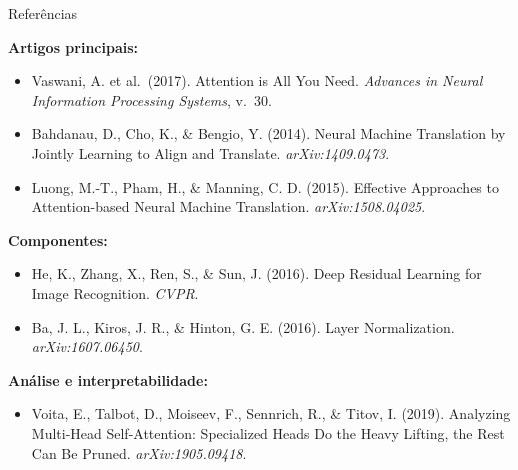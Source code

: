 \documentclass[aspectratio=169,xcolor=dvipsnames]{beamer}
\begin{document}
\begin{frame}{Referências}

\footnotesize

\textbf{Artigos principais:}
\begin{itemize}
    \item Vaswani, A. et al.\ (2017). Attention is All You Need. \textit{Advances in Neural Information Processing Systems}, v.\ 30.
    \item Bahdanau, D., Cho, K., \& Bengio, Y. (2014). Neural Machine Translation by Jointly Learning to Align and Translate. \textit{arXiv:1409.0473}.
    \item Luong, M.-T., Pham, H., \& Manning, C. D. (2015). Effective Approaches to Attention-based Neural Machine Translation. \textit{arXiv:1508.04025}.
\end{itemize}

\vspace{4pt}

\textbf{Componentes:}
\begin{itemize}
    \item He, K., Zhang, X., Ren, S., \& Sun, J. (2016). Deep Residual Learning for Image Recognition. \textit{CVPR}.
    \item Ba, J. L., Kiros, J. R., \& Hinton, G. E. (2016). Layer Normalization. \textit{arXiv:1607.06450}.
\end{itemize}

\vspace{4pt}

\textbf{Análise e interpretabilidade:}
\begin{itemize}
    \item Voita, E., Talbot, D., Moiseev, F., Sennrich, R., \& Titov, I. (2019). Analyzing Multi-Head Self-Attention: Specialized Heads Do the Heavy Lifting, the Rest Can Be Pruned. \textit{arXiv:1905.09418}.
\end{itemize}

\end{frame}
\end{document}
